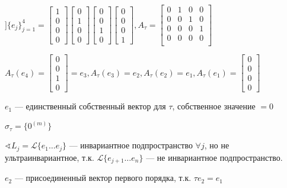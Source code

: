 $] \{e_j\}_{j=1}^4=\begin{bmatrix}
    1 \\
    0 \\
    0 \\
    0
\end{bmatrix}\begin{bmatrix}
    0 \\
    1 \\
    0 \\
    0
\end{bmatrix}\begin{bmatrix}
    0 \\
    0 \\
    1 \\
    0
\end{bmatrix}\begin{bmatrix}
    0 \\
    0 \\
    0 \\
    1
\end{bmatrix}, A_\tau=\begin{bmatrix}
    0 & 1 & 0 & 0 \\
    0 & 0 & 1 & 0 \\
    0 & 0 & 0 & 1 \\
    0 & 0 & 0 & 0 \\
\end{bmatrix}$

$A_\tau(e_4)=\begin{bmatrix}
    0 \\
    0 \\
    1 \\
    0
\end{bmatrix}=e_3, A_\tau(e_3)=e_2, A_\tau(e_2)=e_1, A_\tau(e_1)=\begin{bmatrix}
    0 \\
    0 \\
    0 \\
    0
\end{bmatrix}$

$e_1$ --- единственный собственный вектор для $\tau$, собственное значение $=0$

$\sigma_\tau=\{0^{(m)}\}$

$\sphericalangle L_j=\mathcal L\{e_1\ldots e_j\}$ --- инвариантное подпространство $\forall j$, но не ультраинвариантное, т.к. $\mathcal L\{e_{j+1}\ldots e_n\}$ --- не инвариантное подпространство.

$e_2$ --- присоединенный вектор первого порядка, т.к. $\tau e_2=e_1$

